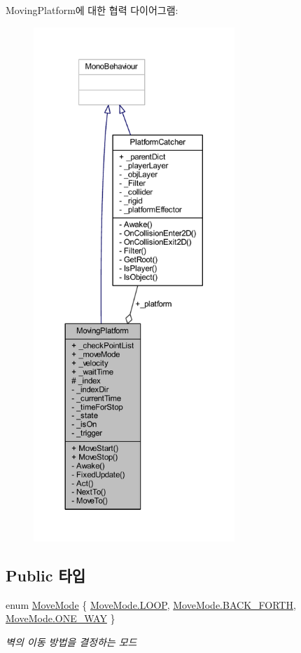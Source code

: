 Moving\+Platform에 대한 협력 다이어그램\+:\nopagebreak
\begin{figure}[H]
\begin{center}
\leavevmode
\includegraphics[height=550pt]{df/d56/class_moving_platform__coll__graph}
\end{center}
\end{figure}
\subsection*{Public 타입}
\begin{DoxyCompactItemize}
\item 
enum \mbox{\hyperlink{class_moving_platform_a7b3427d2906069ecf4c39d69eee53653}{Move\+Mode}} \{ \mbox{\hyperlink{class_moving_platform_a7b3427d2906069ecf4c39d69eee53653a9159b3578e4e1eb31ffdf90acd6f6e40}{Move\+Mode.\+L\+O\+OP}}, 
\mbox{\hyperlink{class_moving_platform_a7b3427d2906069ecf4c39d69eee53653a567fc8818cb224cde6a676cb700ac1e3}{Move\+Mode.\+B\+A\+C\+K\+\_\+\+F\+O\+R\+TH}}, 
\mbox{\hyperlink{class_moving_platform_a7b3427d2906069ecf4c39d69eee53653aaa30404ca3fb4604d829dacae0444dd1}{Move\+Mode.\+O\+N\+E\+\_\+\+W\+AY}}
 \}
\begin{DoxyCompactList}\small\item\em 벽의 이동 방법을 결정하는 모드 \end{DoxyCompactList}\end{DoxyCompactItemize}

